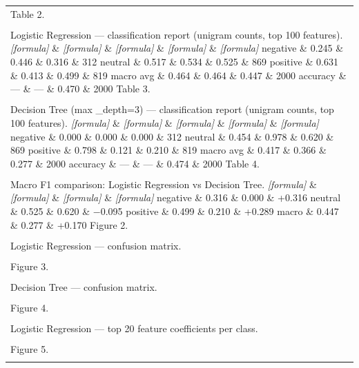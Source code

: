 \documentclass[11pt,a4paper,landscape]{article}
\begin{document}
\begin{longtable}{|p{\dimexpr\linewidth-2\tabcolsep-2\arrayrulewidth\relax}|}
\hline
\rule{0pt}{3.5cm} \\
\hline
Table 2. \\[2pt]
\hline
\rule{0pt}{3.5cm} \\
\hline
Logistic Regression --- classification report (unigram counts, top 100 features). \textit{[formula]} \& \textit{[formula]} \& \textit{[formula]} \& \textit{[formula]} \& \textit{[formula]} negative \& 0.245 \& 0.446 \& 0.316 \& 312 neutral \& 0.517 \& 0.534 \& 0.525 \& 869 positive \& 0.631 \& 0.413 \& 0.499 \& 819 macro avg \& 0.464 \& 0.464 \& 0.447 \& 2000 accuracy \& --- \& --- \& 0.470 \& 2000 Table 3. \\[2pt]
\hline
\rule{0pt}{3.5cm} \\
\hline
Decision Tree (max \_depth=3) --- classification report (unigram counts, top 100 features). \textit{[formula]} \& \textit{[formula]} \& \textit{[formula]} \& \textit{[formula]} \& \textit{[formula]} negative \& 0.000 \& 0.000 \& 0.000 \& 312 neutral \& 0.454 \& 0.978 \& 0.620 \& 869 positive \& 0.798 \& 0.121 \& 0.210 \& 819 macro avg \& 0.417 \& 0.366 \& 0.277 \& 2000 accuracy \& --- \& --- \& 0.474 \& 2000 Table 4. \\[2pt]
\hline
\rule{0pt}{3.5cm} \\
\hline
Macro F1 comparison: Logistic Regression vs Decision Tree. \textit{[formula]} \& \textit{[formula]} \& \textit{[formula]} \& \textit{[formula]} negative \& 0.316 \& 0.000 \& +0.316 neutral \& 0.525 \& 0.620 \& −0.095 positive \& 0.499 \& 0.210 \& +0.289 macro \& 0.447 \& 0.277 \& +0.170 Figure 2. \\[2pt]
\hline
\rule{0pt}{3.5cm} \\
\hline
Logistic Regression --- confusion matrix. \\[2pt]
\hline
\rule{0pt}{3.5cm} \\
\hline
Figure 3. \\[2pt]
\hline
\rule{0pt}{3.5cm} \\
\hline
Decision Tree --- confusion matrix. \\[2pt]
\hline
\rule{0pt}{3.5cm} \\
\hline
Figure 4. \\[2pt]
\hline
\rule{0pt}{3.5cm} \\
\hline
Logistic Regression --- top 20 feature coefficients per class. \\[2pt]
\hline
\rule{0pt}{3.5cm} \\
\hline
Figure 5. \\[2pt]
\hline
\rule{0pt}{3.5cm} \\

\end{longtable}
\end{document}
